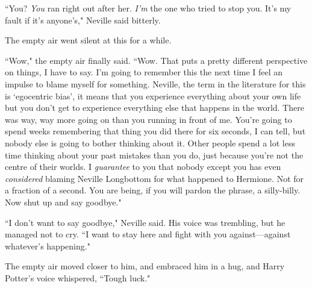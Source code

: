 ``You? \emph{You} ran right out after her. \emph{I'm} the one who tried to stop you. It's my fault if it's anyone's," Neville said bitterly.

The empty air went silent at this for a while.

``Wow," the empty air finally said. ``Wow. That puts a pretty different perspective on things, I have to say. I'm going to remember this the next time I feel an impulse to blame myself for something. Neville, the term in the literature for this is `egocentric bias', it means that you experience everything about your own life but you don't get to experience everything else that happens in the world. There was way, way more going on than you running in front of me. You're going to spend weeks remembering that thing you did there for six seconds, I can tell, but nobody else is going to bother thinking about it. Other people spend a lot less time thinking about your past mistakes than you do, just because you're not the centre of their worlds. I \emph{guarantee} to you that nobody except you has even \emph{considered} blaming Neville Longbottom for what happened to Hermione. Not for a fraction of a second. You are being, if you will pardon the phrase, a silly-billy. Now shut up and say goodbye."

``I don't want to say goodbye," Neville said. His voice was trembling, but he managed not to cry. ``I want to stay here and fight with you against---against whatever's happening."

The empty air moved closer to him, and embraced him in a hug, and Harry Potter's voice whispered, ``Tough luck."

